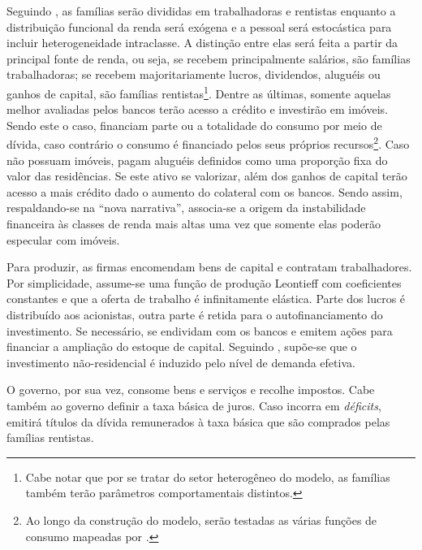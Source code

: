 Seguindo \textcite{carvalho_income_2014}, as famílias serão divididas em trabalhadoras e rentistas enquanto a distribuição funcional da renda será exógena e a pessoal será estocástica para incluir heterogeneidade intraclasse.
A distinção entre elas será feita a partir da principal fonte de renda, ou seja, se recebem principalmente salários, são famílias trabalhadoras; se recebem majoritariamente lucros, dividendos, aluguéis  ou ganhos de capital, são famílias rentistas\footnote{Cabe notar que por se tratar do setor heterogêneo do modelo, as famílias também terão parâmetros comportamentais distintos. 
}.
Dentre as últimas, somente aquelas melhor avaliadas pelos bancos terão acesso a crédito e investirão em imóveis. 
Sendo este o caso, financiam parte ou a totalidade do consumo por meio de dívida, caso contrário o consumo é financiado pelos seus próprios recursos\footnote{Ao longo da construção do modelo, serão testadas as várias funções de consumo mapeadas por \textcite{brochier_macroeconomics_2017}.}.
Caso não possuam imóveis, pagam aluguéis definidos como uma proporção fixa do valor das residências.
Se este ativo se valorizar, além dos ganhos de capital terão acesso a mais  crédito dado o aumento do colateral com os bancos.
Sendo assim, respaldando-se na ``nova narrativa'', associa-se a origem da instabilidade financeira às classes de renda mais altas uma vez que somente elas poderão especular com imóveis.

Para produzir, as firmas encomendam bens de capital e contratam trabalhadores.
Por simplicidade, assume-se uma função de produção Leontieff com coeficientes constantes e que a oferta de trabalho é infinitamente elástica.
Parte dos lucros é distribuído aos acionistas, outra parte é retida para o autofinanciamento do investimento. 
Se necessário, se endividam com os bancos e emitem ações para financiar a ampliação do estoque de capital.
Seguindo \textcite{serrano_sraffian_2017}, supõe-se que o investimento não-residencial é induzido pelo nível de demanda efetiva.

O governo, por sua vez, consome bens e serviços e recolhe impostos. 
Cabe também ao governo definir a taxa básica de juros.
Caso incorra em \textit{déficits}, emitirá títulos da dívida remunerados à taxa básica que são comprados pelas famílias rentistas.

